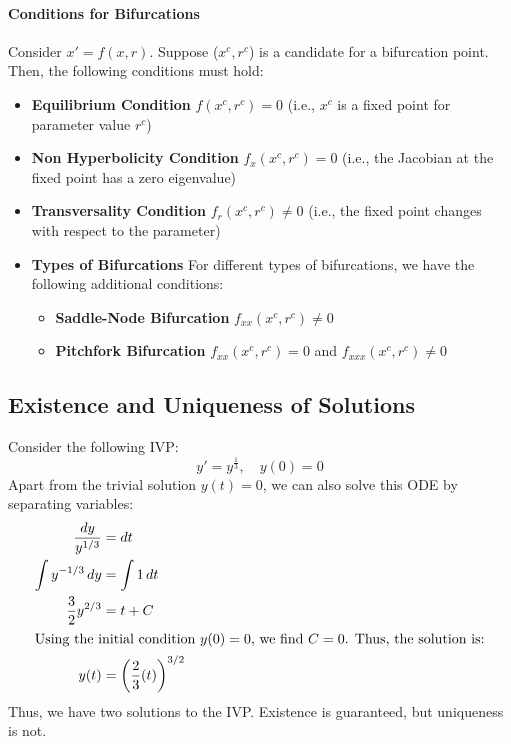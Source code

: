 \documentclass[11pt]{article}
\begin{document}
\paragraph{Conditions for Bifurcations} Consider $x' = f(x, r)$. Suppose ($x^c, r^c$) is a candidate for a bifurcation point. Then, the following conditions must hold:
\begin{itemize}
    \item \textbf{Equilibrium Condition} $f(x^c, r^c) = 0$ (i.e., $x^c$ is a fixed point for parameter value $r^c$)
    \item \textbf{Non Hyperbolicity Condition} $f_x(x^c, r^c) = 0$ (i.e., the Jacobian at the fixed point has a zero eigenvalue)    
    \item \textbf{Transversality Condition} $f_r(x^c, r^c) \neq 0$ (i.e., the fixed point changes with respect to the parameter)
    \item \textbf{Types of Bifurcations} For different types of bifurcations, we have the following additional conditions:
    \begin{itemize}
        \item \textbf{Saddle-Node Bifurcation} $f_{xx}(x^c, r^c) \neq 0$        
        \item \textbf{Pitchfork Bifurcation} $f_{xx}(x^c, r^c) = 0$ and $f_{xxx}(x^c, r^c) \neq 0$
    \end{itemize}
\end{itemize}
\subsection{Existence and Uniqueness of Solutions}
\begin{example}
    Consider the following IVP:
    $$
    y' = y^{\frac{1}{3}}, \quad y(0) = 0
    $$
    Apart from the trivial solution \( y(t) = 0 \), we can also solve this ODE by separating variables:
    \begin{align*}
        \frac{dy}{y^{1/3}} &= dt \\
        \int y^{-1/3} \, dy &= \int 1 \, dt \\
        \frac{3}{2} y^{2/3} &= t + C \\
        \intertext{Using the initial condition \( y(0) = 0 \), we find \( C = 0 \). Thus, the solution is:}
        y(t) &= \left( \frac{2}{3}(t ) \right)^{3/2}
    \end{align*}
    Thus, we have two solutions to the IVP. Existence is guaranteed, but uniqueness is not.
\end{example}
\end{document}
